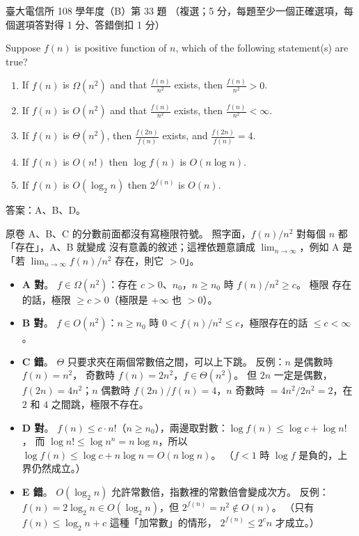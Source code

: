 \begin{pastexam}[label={px:ntu-108-comm-dsab-33}]{臺大電信所 108 學年度（B）第 33 題}
（複選；5 分，每題至少一個正確選項，每個選項答對得 1 分、答錯倒扣 1 分）

Suppose $f(n)$ is positive function of $n$, which of the following statement(s) are true?
\begin{enumerate}[label=\Alph*.]
\item If $f(n)$ is $\Omega(n^2)$ and that $\frac{f(n)}{n^2}$ exists, then $\frac{f(n)}{n^2}>0$.
\item If $f(n)$ is $O(n^2)$ and that $\frac{f(n)}{n^2}$ exists, then $\frac{f(n)}{n^2}<\infty$.
\item If $f(n)$ is $\Theta(n^2)$, then $\frac{f(2n)}{f(n)}$ exists, and $\frac{f(2n)}{f(n)}=4$.
\item If $f(n)$ is $O(n!)$ then $\log f(n)$ is $O(n\log n)$.
\item If $f(n)$ is $O(\log_2 n)$ then $2^{f(n)}$ is $O(n)$.
\end{enumerate}
\end{pastexam}

\begin{pastsoln}
答案：A、B、D。

原卷 A、B、C 的分數前面都沒有寫極限符號。 照字面，$f(n)/n^2$ 對每個 $n$ 都「存在」，A、B 就變成
沒有意義的敘述；這裡依題意讀成 $\lim_{n\to\infty}$，例如 A 是「若
$\lim_{n\to\infty} f(n)/n^2$ 存在，則它 $> 0$」。

\begin{itemize}
\item \textbf{A 對}。 $f \in \Omega(n^2)$：存在 $c > 0$、$n_0$，$n \ge n_0$ 時 $f(n)/n^2 \ge c$。 極限
存在的話，極限 $\ge c > 0$（極限是 $+\infty$ 也 $> 0$）。
\item \textbf{B 對}。 $f \in O(n^2)$：$n \ge n_0$ 時 $0 < f(n)/n^2 \le c$，極限存在的話 $\le c < \infty$。
\item \textbf{C 錯}。 $\Theta$ 只要求夾在兩個常數倍之間，可以上下跳。 反例：$n$ 是偶數時 $f(n) = n^2$，
奇數時 $f(n) = 2n^2$，$f \in \Theta(n^2)$。 但 $2n$ 一定是偶數，$f(2n) = 4n^2$；$n$ 偶數時
$f(2n)/f(n) = 4$，$n$ 奇數時 $= 4n^2 / 2n^2 = 2$，在 $2$ 和 $4$ 之間跳，極限不存在。
\item \textbf{D 對}。 $f(n) \le c \cdot n!$（$n \ge n_0$），兩邊取對數：$\log f(n) \le \log c + \log n!$，
而 $\log n! \le \log n^n = n \log n$，所以 $\log f(n) \le \log c + n \log n = O(n \log n)$。
（$f < 1$ 時 $\log f$ 是負的，上界仍然成立。）
\item \textbf{E 錯}。 $O(\log_2 n)$ 允許常數倍，指數裡的常數倍會變成次方。 反例：$f(n) = 2\log_2 n
\in O(\log_2 n)$，但 $2^{f(n)} = n^2 \notin O(n)$。 （只有 $f(n) \le \log_2 n + c$ 這種「加常數」的情形，
$2^{f(n)} \le 2^c n$ 才成立。）
\end{itemize}
\end{pastsoln}
